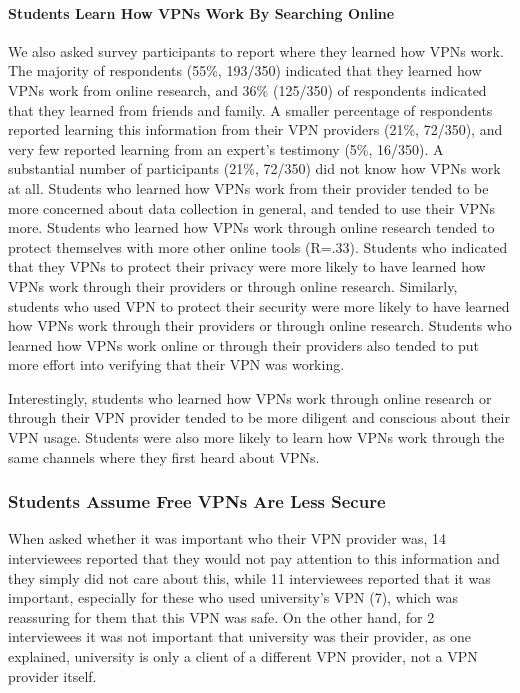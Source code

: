 \paragraph{Students Learn How VPNs Work By Searching Online}
We also asked survey participants to report where they learned how VPNs work.
The majority of respondents (55\%, 193/350) indicated that they learned how
VPNs work from online research, and 36\% (125/350) of respondents indicated
that they learned from friends and family. A smaller percentage of respondents
reported learning this information from their VPN providers (21\%, 72/350),
and very few reported learning from an expert’s testimony (5\%, 16/350). A
substantial number of participants (21\%, 72/350) did not know how VPNs work
at all.  Students who learned how VPNs work from their provider tended to be
more concerned about data collection in general, and tended to use their VPNs
more. Students who learned how VPNs work through online research tended to
protect themselves with more other online tools (R=.33). Students who
indicated that they VPNs to protect their privacy were more likely to have
learned how VPNs work through their providers or through online research.
Similarly, students who used VPN to protect their security were more likely to
have learned how VPNs work through their providers or through online research.
Students who learned how VPNs work online or through their providers also
tended to put more effort into verifying that their VPN was working.

Interestingly, students who learned how VPNs work through online research or
through their VPN provider tended to be more diligent and conscious about
their VPN usage. Students were also more likely to learn how VPNs work through
the same channels where they first heard about VPNs. 


\subsubsection{Students Assume Free VPNs Are Less Secure}

When asked whether it was important who their
VPN provider was, 14 interviewees reported that they would not pay attention
to this information and they simply did not care about this, while 11
interviewees reported that it was important, especially for these who used
university’s VPN (7), which was reassuring for them that this VPN was safe. On
the other hand, for 2 interviewees it was not important that university was
their provider, as one explained, university is only a client of a different
VPN provider, not a VPN provider itself. 

